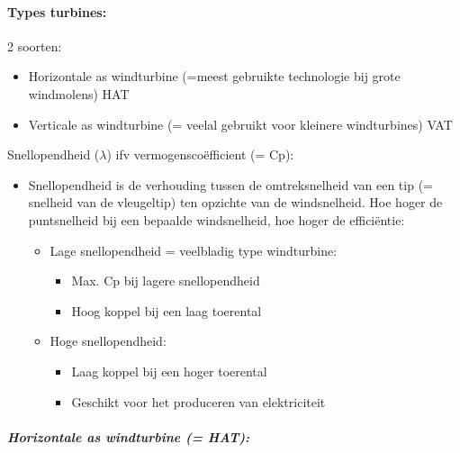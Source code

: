 \documentclass[12pt]{article}
\begin{document}
\paragraph{Types turbines:}
2 soorten:\begin{itemize}
    \item Horizontale as windturbine (=meest gebruikte technologie bij grote windmolens) HAT 
    \item Verticale as windturbine (= veelal gebruikt voor kleinere windturbines) VAT
\end{itemize}
Snellopendheid ($\lambda$) ifv vermogenscoëfficient (= Cp):\begin{itemize}
    \item Snellopendheid is de verhouding tussen de omtreksnelheid van een tip
    (= snelheid van de vleugeltip) ten opzichte van de windsnelheid. Hoe hoger de puntsnelheid bij een bepaalde windsnelheid, hoe hoger de efficiëntie:\begin{itemize}
        \item Lage snellopendheid = veelbladig type
        windturbine:\begin{itemize}
            \item Max. Cp bij lagere snellopendheid
            \item Hoog koppel bij een laag toerental
        \end{itemize}
        \item Hoge snellopendheid:\begin{itemize}
            \item Laag koppel bij een hoger toerental
            \item Geschikt voor het produceren van elektriciteit            
        \end{itemize}
    \end{itemize}
\end{itemize}
\subparagraph{Horizontale as windturbine (= HAT):}
\end{document}
